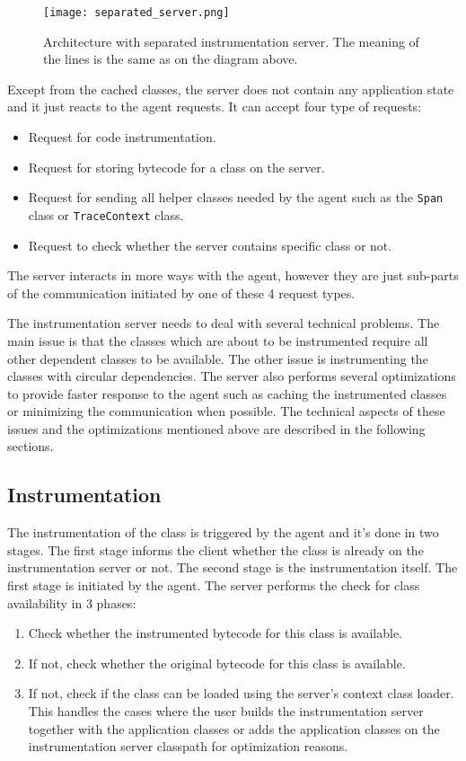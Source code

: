  \begin{figure}
 	\centering
 	\texttt{[image: separated\_server.png]}
 	\caption{Architecture with separated instrumentation server. The meaning of the lines is the same as on the diagram above.}
 	\label{fig:separated_server}
 \end{figure}

Except from the cached classes, the server does not contain any application state and it just reacts to the agent requests. It can accept four type of requests:
\begin{itemize}
	\item Request for code instrumentation.
	\item Request for storing bytecode for a class on the server.
	\item Request for sending all helper classes needed by the agent such as the \texttt{Span} class or \texttt{TraceContext} class.
	\item Request to check whether the server contains specific class or not.
\end{itemize}
The server interacts in more ways with the agent, however they are just sub-parts of the communication initiated by one of these 4 request types.	

The instrumentation server needs to deal with several technical problems. The main issue is that the classes which are about to be instrumented require all other dependent classes to be available. The other issue is instrumenting the classes with circular dependencies. The server also performs several optimizations to provide faster response to the agent such as caching the instrumented classes or minimizing the communication when possible. The technical aspects of these issues and the optimizations mentioned above are described in the following sections.
\subsection{Instrumentation}
The instrumentation of the class is triggered by the agent and it's done in two stages. The first stage informs the client whether the class is already on the instrumentation server or not. The second stage is the instrumentation itself. The first stage is initiated by the agent. The server performs the check for class availability in 3 phases:
\begin{enumerate}
	\item Check whether the instrumented bytecode for this class is available.
	\item If not, check whether the original bytecode for this class is available.
	\item If not, check if the class can be loaded using the server's context class loader. This handles the cases where the user builds the instrumentation server together with the application classes or adds the application classes on the instrumentation server classpath for optimization reasons.
\end{enumerate}


